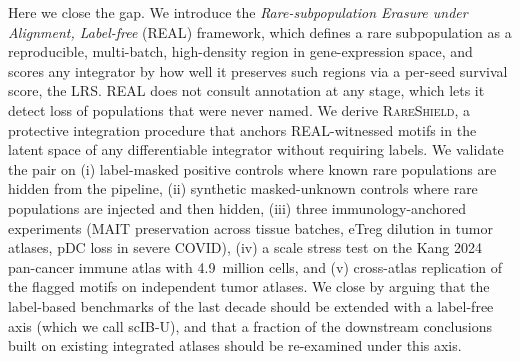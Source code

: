 









Here we close the gap.  We introduce the \emph{Rare-subpopulation Erasure under Alignment, Label-free} (\textsc{REAL}) framework, which defines a rare subpopulation as a reproducible, multi-batch, high-density region in gene-expression space, and scores any integrator by how well it preserves such regions via a per-seed survival score, the LRS.  REAL does not consult annotation at any stage, which lets it detect loss of populations that were never named.  We derive \textsc{RareShield}, a protective integration procedure that anchors REAL-witnessed motifs in the latent space of any differentiable integrator without requiring labels.  We validate the pair on (i) label-masked positive controls where known rare populations are hidden from the pipeline, (ii) synthetic masked-unknown controls where rare populations are injected and then hidden, (iii) three immunology-anchored experiments (MAIT preservation across tissue batches, eTreg dilution in tumor atlases, pDC loss in severe COVID), (iv) a scale stress test on the Kang 2024 pan-cancer immune atlas with 4.9~million cells, and (v) cross-atlas replication of the flagged motifs on independent tumor atlases.  We close by arguing that the label-based benchmarks of the last decade should be extended with a label-free axis (which we call scIB-U), and that a fraction of the downstream conclusions built on existing integrated atlases should be re-examined under this axis.
